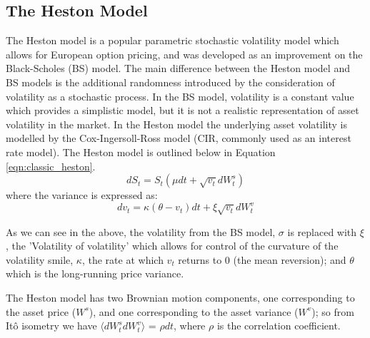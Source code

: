 \documentclass[12pt,oneside]{article}
\begin{document}
\subsection{The Heston Model}
The Heston model is a popular parametric stochastic volatility model which allows for European option pricing, and was developed as an improvement on the Black-Scholes (BS) model. The main difference between the Heston model and BS models is the additional randomness introduced by the consideration of volatility as a stochastic process. In the BS model, volatility is a constant value which provides a simplistic model, but it is not a realistic representation of asset volatility in the market. In the Heston model the underlying asset volatility is modelled by the Cox-Ingersoll-Ross model (CIR, commonly used as an interest rate model). The Heston model is outlined below in Equation \ref{eqn:classic_heston}.
\begin{equation}
\label{eqn:classic_heston}
dS_t= S_t(\mu dt + \sqrt{v_t} dW_t^{s})
\end{equation}
where the variance is expressed as: 
\begin{equation}
\label{eqn:classic_heston_var}
dv_t = \kappa (\theta - v_t)dt + \xi\sqrt{v_t}dW_t^{v}
\end{equation}

As we can see in the above, the volatility from the BS model, $\sigma$ is replaced with $\xi$, the 'Volatility of volatility' which allows for control of the curvature of the volatility smile, $\kappa$, the rate at which $v_t$ returns to 0 (the mean reversion); and $\theta$ which is the long-running price variance. 

The Heston model has two Brownian motion components, one corresponding to the asset price ($W^s$), and one corresponding to the asset variance ($W^v$); so from It\^o isometry we have $\langle  dW_t^{s} dW_t^{v}\rangle$ = $\rho dt$, where $\rho$ is the correlation coefficient. 
\end{document}
